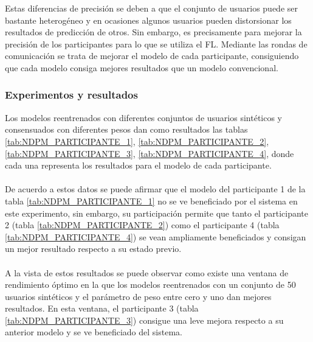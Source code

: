 Estas diferencias de precisión se deben a que el conjunto de usuarios puede ser bastante heterogéneo y en ocasiones algunos usuarios pueden distorsionar los resultados de predicción de otros. Sin embargo, es precisamente para mejorar la precisión de los participantes para lo que se utiliza el FL. Mediante las rondas de comunicación se trata de mejorar el modelo de cada participante, consiguiendo que cada modelo consiga mejores resultados que un modelo convencional.

\subsubsection{Experimentos y resultados}
Los modelos reentrenados con diferentes conjuntos de usuarios sintéticos y consensuados con diferentes pesos dan como resultados las tablas \ref{tab:NDPM_PARTICIPANTE_1}, \ref{tab:NDPM_PARTICIPANTE_2}, \ref{tab:NDPM_PARTICIPANTE_3}, \ref{tab:NDPM_PARTICIPANTE_4}, donde cada una representa los resultados para el modelo de cada participante.
\\ \\
De acuerdo a estos datos se puede afirmar que el modelo del participante 1 de la tabla \ref{tab:NDPM_PARTICIPANTE_1} no se ve beneficiado por el sistema en este experimento, sin embargo, su participación permite que tanto el participante 2 (tabla \ref{tab:NDPM_PARTICIPANTE_2}) como el participante 4 (tabla \ref{tab:NDPM_PARTICIPANTE_4}) se vean ampliamente beneficiados y consigan un mejor resultado respecto a su estado previo.
\\ \\
A la vista de estos resultados se puede observar como existe una ventana de rendimiento óptimo en la que los modelos reentrenados con un conjunto de 50 usuarios sintéticos y el parámetro de peso entre cero y uno dan mejores resultados. En esta ventana, el participante 3 (tabla \ref{tab:NDPM_PARTICIPANTE_3}) consigue una leve mejora respecto a su anterior modelo y se ve beneficiado del sistema. 
